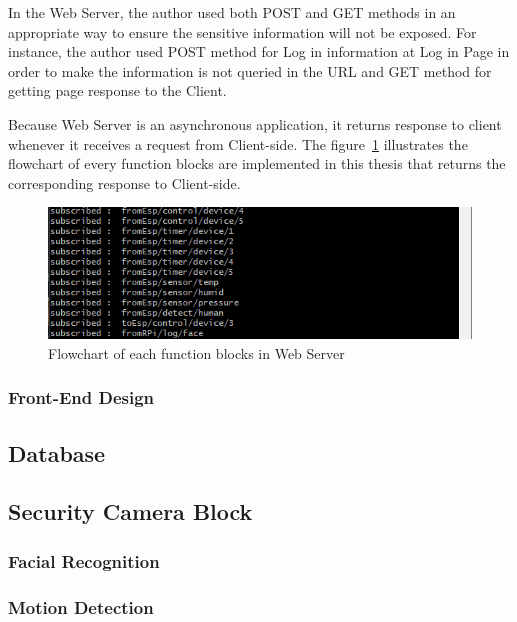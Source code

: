         In the Web Server, the author used both POST and GET methods in an appropriate way to ensure the sensitive information will not be exposed. For instance, the author used POST method for Log in information at Log in Page in order to make the information is not queried in the URL and GET method for getting page response to the Client.

        Because Web Server is an asynchronous application, it returns response to client whenever it receives a request from Client-side. The figure~\ref{fig:responseBlock} illustrates the flowchart of every function blocks are implemented in this thesis that returns the corresponding response to Client-side.
        \begin{figure}[!htb]
            \begin{center}
            \includegraphics[scale=0.8]{images/webSub.png}
            \caption{Flowchart of each function blocks in Web Server}
            \label{fig:responseBlock}
            \end{center}
        \end{figure}

        \subsubsection{Front-End Design}
    \subsection{Database} 
    \subsection{Security Camera Block}
        \subsubsection{Facial Recognition}
        \subsubsection{Motion Detection}

        





